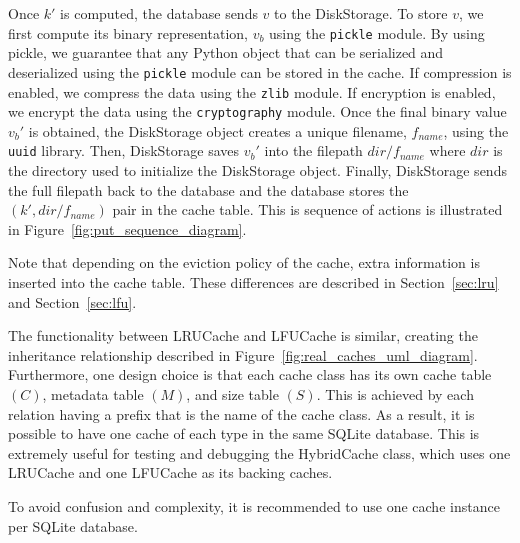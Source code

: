 Once $k'$ is computed, the database sends $v$ to the DiskStorage.
To store $v$, we first
compute its binary representation, $v_b$ using the \texttt{pickle} module.
By using pickle, we guarantee that any Python object
that can be serialized and deserialized using
the \texttt{pickle} module can be stored in the cache.
If compression is enabled, we compress the data using the \texttt{zlib} module.
If encryption is enabled, we encrypt the data using the \texttt{cryptography}
module. Once the final binary value $v_b'$ is obtained,
the DiskStorage object creates a unique
filename, $f_{name}$, using the \texttt{uuid} library.
Then, DiskStorage saves $v_b'$ into the filepath $dir/f_{name}$ where $dir$ is the directory
used to initialize the DiskStorage object. Finally, DiskStorage sends the full filepath
back to the database and the database stores the $(k', dir/f_{name})$ pair in the cache table.
This is sequence of actions is illustrated in Figure~\ref{fig:put_sequence_diagram}.

Note that depending on the eviction policy of the cache, extra information
is inserted into the cache table. These differences are described in
Section~\ref{sec:lru} and Section~\ref{sec:lfu}.

The functionality between LRUCache and LFUCache
is similar, creating the inheritance relationship described in Figure~\ref{fig:real_caches_uml_diagram}.
Furthermore, one design choice is that each cache class has its own cache table $(C)$,
metadata table $(M)$, and size table $(S)$.
This is achieved by each relation having a prefix
that is the name of the cache class. As a result, it is possible to have
one cache of each type in the same SQLite database. This is extremely useful
for testing and debugging the HybridCache class,
which uses one LRUCache and one LFUCache
as its backing caches.

\begin{tcolorbox}[colback=blue!5!white, colframe=blue!75!black, title=Note]
    To avoid confusion and complexity, it is recommended to use
    one cache instance per SQLite database.
\end{tcolorbox}

